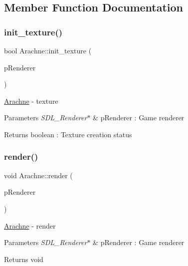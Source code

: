 \subsection{Member Function Documentation}
\mbox{\label{classArachne_aded2ad5435693781c82cefaf98796b39}} 
\subsubsection{\texorpdfstring{init\+\_\+texture()}{init\_texture()}}
{\footnotesize\ttfamily bool Arachne\+::init\+\_\+texture (\begin{DoxyParamCaption}\item[{S\+D\+L\+\_\+\+Renderer $\ast$}]{p\+Renderer }\end{DoxyParamCaption})}

\hyperlink{classArachne}{Arachne} -\/ texture 
\begin{DoxyParams}{Parameters}
{\em S\+D\+L\+\_\+\+Renderer$\ast$} & p\+Renderer \+: Game renderer \\
\hline
\end{DoxyParams}
\begin{DoxyReturn}{Returns}
boolean \+: Texture creation status 
\end{DoxyReturn}
\mbox{\label{classArachne_afc79c16c885252e652fc4b2ffcc7a3a2}} 
\subsubsection{\texorpdfstring{render()}{render()}}
{\footnotesize\ttfamily void Arachne\+::render (\begin{DoxyParamCaption}\item[{S\+D\+L\+\_\+\+Renderer $\ast$}]{p\+Renderer }\end{DoxyParamCaption})}

\hyperlink{classArachne}{Arachne} -\/ render 
\begin{DoxyParams}{Parameters}
{\em S\+D\+L\+\_\+\+Renderer$\ast$} & p\+Renderer \+: Game renderer \\
\hline
\end{DoxyParams}
\begin{DoxyReturn}{Returns}
void 
\end{DoxyReturn}
\mbox{\label{classArachne_a3eb4774956f6af639d99e6e92c359ca3}} 
